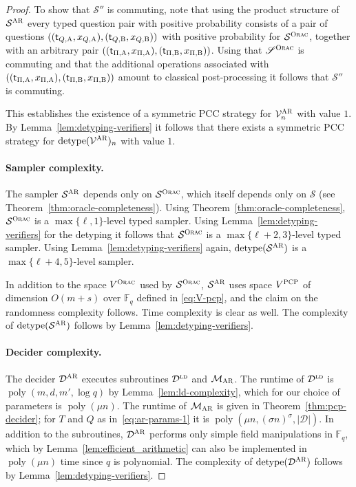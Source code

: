 \documentclass[11pt]{article}
\theoremstyle{definition}
\newcommand{\F}{\ensuremath{\mathbb{F}}}
\newcommand{\ld}{\textsc{ld}}
\DeclareMathOperator{\poly}{poly}
\newcommand{\sampler}{\mathcal{S}}
\newcommand{\decider}{\mathcal{D}}
\newcommand{\verifier}{\mathcal{V}}
\newcommand{\strategy}{\mathscr{S}}
\newcommand{\detype}{\mathrm{detype}}
\newcommand{\gamestyle}[1]{\ensuremath{\textsc{#1}}\xspace}
\newcommand{\ora}{\gamestyle{Orac}}
\newcommand{\pcp}{\gamestyle{PCP}}
\newcommand{\ar}{\gamestyle{AR}}
\newcommand{\labelstyle}[1]{\ensuremath{\textsc{#1}}\xspace}
\newcommand{\tvarstyle}[1]{\mathsf{#1}}
\newcommand{\tvar}{\ensuremath{\tvarstyle{t}}}
\newcommand{\alice}{\labelstyle{A}}
\newcommand{\bob}{\labelstyle{B}}
\newcommand{\pcpverifier}{\mathcal{M}_\ar}
\begin{document}
\begin{proof}
	To show that $\strategy''$ is commuting, note that using the product structure
  of $\sampler^\ar$ every typed question pair with positive probability consists
  of a pair of questions $((\tvar_{Q,\alice},x_{Q, \alice}),(\tvar_{Q,\bob},
  x_{Q,\bob})) $ with positive probability for $\sampler^\ora$, together with an
  arbitrary pair $((\tvar_{\Pi,\alice},x_{\Pi, \alice}),
  (\tvar_{\Pi,\bob}, x_{\Pi,\bob}))$.
  Using that $\strategy^\ora$ is commuting and that the additional operations
  associated with $((\tvar_{\Pi,\alice},x_{\Pi, \alice}),
  (\tvar_{\Pi,\bob}, x_{\Pi,\bob}))$ amount to classical post-processing it
  follows that $\strategy''$ is commuting.

  This establishes the existence of a symmetric PCC strategy for
  $\verifier^\ar_n$ with value $1$.
	By Lemma~\ref{lem:detyping-verifiers} it follows that there exists a symmetric
  PCC strategy for $\detype(\verifier^\ar)_n$ with value $1$.

  \paragraph{Sampler complexity.}
  The sampler $\sampler^\ar$ depends only on $\sampler^\ora$, which itself
  depends only on $\sampler$ (see Theorem~\ref{thm:oracle-completeness}).
  Using Theorem~\ref{thm:oracle-completeness}, $\sampler^\ora$ is a
  $\max\{\ell,1\}$-level typed sampler.
  Using Lemma~\ref{lem:detyping-verifiers} for the detyping it follows that
  $\sampler^\ora$ is a $\max\{\ell+2,3\}$-level typed sampler.
  Using Lemma~\ref{lem:detyping-verifiers} again, $\detype(\sampler^\ar)$ is a
  $\max\{\ell+4,5\}$-level sampler.
	

In addition to the space $V^\ora$ used by $\sampler^\ora$, $\sampler^\ar$ uses
  space $V^\pcp$ of dimension $O(m+s)$ over $\F_q$ defined in \cref{eq:V-pcp},
  and the claim on the randomness complexity follows.
  Time complexity is clear as well.
  The complexity of $\detype(\sampler^\ar)$ follows by
  Lemma~\ref{lem:detyping-verifiers}.

  \paragraph{Decider complexity.}
  The decider $\decider^\ar$ executes subroutines $\decider^\ld$ and
  $\pcpverifier$.
  The runtime of $\decider^\ld$ is $\poly(m, d, m', \log q)$ by
  Lemma~\ref{lem:ld-complexity}, which for our choice of parameters is
  $\poly(\mu n)$.
  The runtime of $\pcpverifier$ is given in Theorem~\ref{thm:pcp-decider}; for
  $T$ and $Q$ as in~\eqref{eq:ar-params-1} it is $\poly(\mu n, (\sigma
  n)^\sigma,|\decider|)$.
  In addition to the subroutines, $\decider^\ar$ performs only simple field
  manipulations in $\F_q$, which by Lemma~\ref{lem:efficient_arithmetic} can
  also be implemented in $\poly(\mu n)$ time since $q$ is polynomial.
  The complexity of $\detype(\decider^\ar)$ follows by
  Lemma~\ref{lem:detyping-verifiers}.
 

\end{proof}
\end{document}
